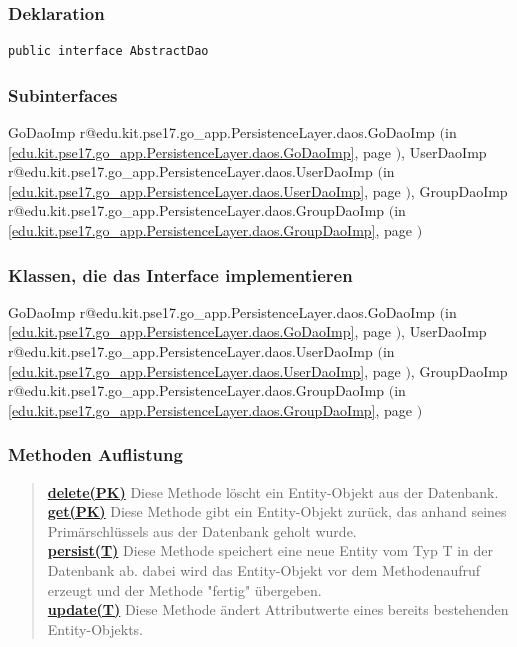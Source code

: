 \documentclass[11pt,a4paper]{article}
\makeatletter
\newcommand{\refdefined}[1]{
\expandafter\ifx\csname r@#1\endcsname\relax
\relax\else
{$($in \ref{#1}, page \pageref{#1}$)$}\fi}
\makeatother
\begin{document}
{{{{{{\subsubsection{Deklaration}{
\begin{lstlisting}[frame=none]
public interface AbstractDao
\end{lstlisting}
\subsubsection{Subinterfaces}{GoDaoImp\small{\refdefined{edu.kit.pse17.go_app.PersistenceLayer.daos.GoDaoImp}}, UserDaoImp\small{\refdefined{edu.kit.pse17.go_app.PersistenceLayer.daos.UserDaoImp}}, GroupDaoImp\small{\refdefined{edu.kit.pse17.go_app.PersistenceLayer.daos.GroupDaoImp}}}
\subsubsection{Klassen, die das Interface implementieren}{GoDaoImp\small{\refdefined{edu.kit.pse17.go_app.PersistenceLayer.daos.GoDaoImp}}, UserDaoImp\small{\refdefined{edu.kit.pse17.go_app.PersistenceLayer.daos.UserDaoImp}}, GroupDaoImp\small{\refdefined{edu.kit.pse17.go_app.PersistenceLayer.daos.GroupDaoImp}}}
\subsubsection{Methoden Auflistung}{
\begin{verse}
\hyperlink{edu.kit.pse17.go_app.PersistenceLayer.daos.AbstractDao.delete(PK)}{{\bf delete(PK)}} Diese Methode löscht ein Entity-Objekt aus der Datenbank.\\
\hyperlink{edu.kit.pse17.go_app.PersistenceLayer.daos.AbstractDao.get(PK)}{{\bf get(PK)}} Diese Methode gibt ein Entity-Objekt zurück, das anhand seines Primärschlüssels aus der Datenbank geholt wurde.\\
\hyperlink{edu.kit.pse17.go_app.PersistenceLayer.daos.AbstractDao.persist(T)}{{\bf persist(T)}} Diese Methode speichert eine neue Entity vom Typ T in der Datenbank ab. dabei wird das Entity-Objekt vor dem Methodenaufruf erzeugt und der Methode "fertig" übergeben.\\
\hyperlink{edu.kit.pse17.go_app.PersistenceLayer.daos.AbstractDao.update(T)}{{\bf update(T)}} Diese Methode ändert Attributwerte eines bereits bestehenden Entity-Objekts.\\
\end{verse}
}
}}}}}}}
\end{document}
